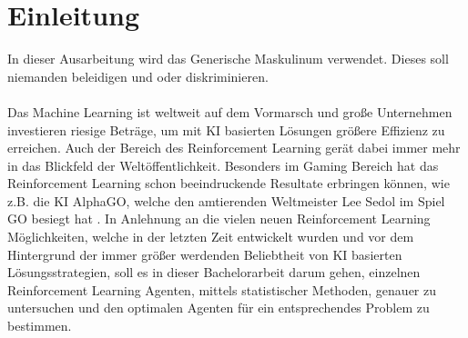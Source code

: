 \chapter{Einleitung} \label{chap:Einleitung}
In dieser Ausarbeitung wird das Generische Maskulinum verwendet. Dieses soll niemanden beleidigen und oder diskriminieren.\\
\\Das Machine Learning ist weltweit auf dem Vormarsch und große Unternehmen investieren riesige Beträge, um mit KI basierten Lösungen größere Effizienz zu erreichen. Auch der Bereich des Reinforcement Learning gerät dabei immer mehr in das Blickfeld der Weltöffentlichkeit. Besonders im Gaming Bereich hat das Reinforcement Learning schon beeindruckende Resultate erbringen können, wie z.B. die KI AlphaGO, welche den amtierenden Weltmeister Lee Sedol im Spiel GO besiegt hat \citep{UAV}. In Anlehnung an die vielen neuen Reinforcement Learning Möglichkeiten, welche in der letzten Zeit entwickelt wurden und vor dem Hintergrund der immer größer werdenden Beliebtheit von KI basierten Lösungsstrategien, soll es in dieser Bachelorarbeit darum gehen, einzelnen Reinforcement Learning Agenten, mittels statistischer Methoden, genauer zu untersuchen und den optimalen Agenten für ein entsprechendes Problem zu bestimmen.

